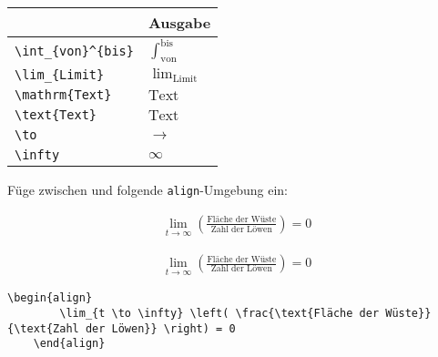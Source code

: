 \documentclass["WS\space 16-17\space -\space LaTeX-Kurs\space -\space Praesentation\space -\space 1.tex"]{subfiles}
\begin{document}
\begin{frame}[fragile]
	\begin{center}
		\begin{tabular}{ll}
			\toprule
			\color{math-cmd}{Mathe}\color{black}{-Befehl}							&	Ausgabe					\\ \midrule
			\lstinline|\int_{von}^{bis}|		&	$\int_{\text{von}}^{\text{bis}}$		\\ \addlinespace[0.5em]
			\lstinline|\lim_{Limit}|		&	$\lim_{\text{Limit}}$		\\
			\lstinline|\mathrm{Text}|		&	$\mathrm{Text}$		
      \\
			\lstinline|\text{Text}|		&	$\text{Text}$		
			\\
			\lstinline|\to|					&	$\to$		\\
			\lstinline|\infty|					&	$\infty$		\\
			\bottomrule
		\end{tabular}
	\end{center}
	\pause\btVFill
	\Aufgabee
		Füge zwischen  und  folgende \lstinline[basicstyle=\normalfont\normalsize]|align|-Umgebung ein:
	\begin{outputbox}
	    \begin{align}
		    \lim_{t \to \infty} \left( \frac{\text{Fläche der Wüste}}{\text{Zahl der Löwen}} \right) = 0
	    \end{align}	
    \end{outputbox}
	\vspace{0.3cm}
\end{frame}
\begin{frame}[fragile]
	\Losung
	\begin{outputbox}
	    \begin{align}
	      \lim_{t \to \infty} \left( \frac{\text{Fläche der Wüste}}{\text{Zahl der Löwen}} \right) = 0
	    \end{align}
	\end{outputbox}

	\Code
	\begin{lstlisting}[gobble=4]
    \begin{align}
        \lim_{t \to \infty} \left( \frac{\text{Fläche der Wüste}}{\text{Zahl der Löwen}} \right) = 0
    \end{align}
	\end{lstlisting}
\end{frame}
\end{document}

